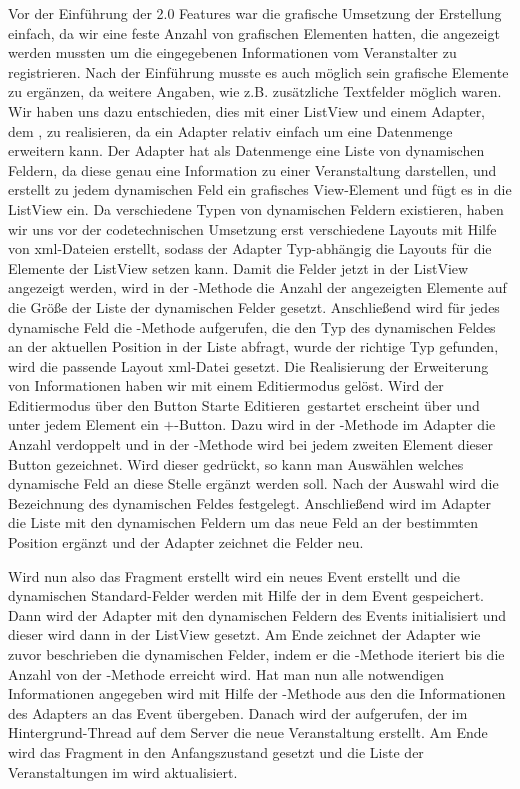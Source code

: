Vor der Einführung der 2.0 Features war die grafische Umsetzung der Erstellung einfach, da wir eine feste Anzahl von grafischen Elementen hatten, die angezeigt werden mussten um die eingegebenen Informationen vom Veranstalter zu registrieren. Nach der Einführung musste es auch möglich sein grafische Elemente zu ergänzen, da weitere Angaben, wie z.B. zusätzliche Textfelder möglich waren. Wir haben uns dazu entschieden, dies mit einer ListView und einem Adapter, dem , zu realisieren, da ein Adapter relativ einfach um eine Datenmenge erweitern kann. Der Adapter hat als Datenmenge eine Liste von dynamischen Feldern, da diese genau eine Information zu einer Veranstaltung darstellen, und erstellt zu jedem dynamischen Feld ein grafisches View-Element und fügt es in die ListView ein. Da verschiedene Typen von dynamischen Feldern existieren, haben wir uns vor der codetechnischen Umsetzung erst verschiedene Layouts mit Hilfe von xml-Dateien erstellt, sodass der Adapter Typ-abhängig die Layouts für die Elemente der ListView setzen kann. Damit die Felder jetzt in der ListView angezeigt werden, wird in der -Methode die Anzahl der angezeigten Elemente auf die Größe der Liste der dynamischen Felder gesetzt. Anschließend wird für jedes dynamische Feld die -Methode aufgerufen, die den Typ des dynamischen Feldes an der aktuellen Position in der Liste abfragt, wurde der richtige Typ gefunden, wird die passende Layout xml-Datei gesetzt. Die Realisierung der Erweiterung von Informationen haben wir mit einem Editiermodus gelöst. Wird der Editiermodus über den Button \glqq Starte Editieren\grqq\ gestartet erscheint über und unter jedem Element ein \glqq$+$\grqq-Button. Dazu wird in der -Methode im Adapter die Anzahl verdoppelt und in der -Methode wird bei jedem zweiten Element dieser Button gezeichnet. Wird dieser gedrückt, so kann man Auswählen welches dynamische Feld an diese Stelle ergänzt werden soll. Nach der Auswahl wird die Bezeichnung des dynamischen Feldes festgelegt. Anschließend wird im Adapter die Liste mit den dynamischen Feldern um das neue Feld an der bestimmten Position ergänzt und der Adapter zeichnet die Felder neu.

Wird nun also das Fragment erstellt wird ein neues Event erstellt und die dynamischen Standard-Felder werden mit Hilfe der  in dem Event gespeichert. Dann wird der Adapter mit den dynamischen Feldern des Events initialisiert und dieser wird dann in der ListView gesetzt. Am Ende zeichnet der Adapter wie zuvor beschrieben die dynamischen Felder, indem er die -Methode iteriert bis die Anzahl von der -Methode erreicht wird. Hat man nun alle notwendigen Informationen angegeben wird mit Hilfe der -Methode aus den  die Informationen des Adapters an das Event übergeben. Danach wird der  aufgerufen, der im Hintergrund-Thread auf dem Server die neue Veranstaltung erstellt. Am Ende wird das Fragment in den Anfangszustand gesetzt und die Liste der Veranstaltungen im  wird aktualisiert.


